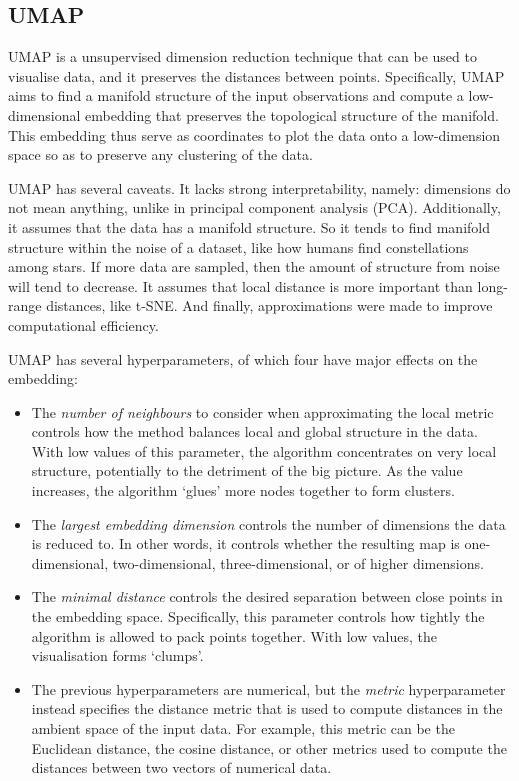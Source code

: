 \subsection{UMAP}
\label{subsec:analysis-clustering-umap}

UMAP \parencite{mcinnesUMAPUniformManifold2020} is a unsupervised dimension reduction technique that can be used to visualise data, and it preserves the distances between points.
Specifically, UMAP aims to find a manifold structure of the input observations and compute a low-dimensional embedding that preserves the topological structure of the manifold.
This embedding thus serve as coordinates to plot the data onto a low-dimension space so as to preserve any clustering of the data.

UMAP has several caveats.
It lacks strong interpretability, namely: dimensions do not mean anything, unlike in principal component analysis (PCA).
Additionally, it assumes that the data has a manifold structure.
So it tends to find manifold structure within the noise of a dataset, like how humans find constellations among stars.
If more data are sampled, then the amount of structure from noise will tend to decrease.
It assumes that local distance is more important than long-range distances, like t-SNE.
And finally, approximations were made to improve computational efficiency.

UMAP has several hyperparameters, of which four have major effects on the embedding:
\begin{itemize}
  \item The \emph{number of neighbours} to consider when approximating the local metric controls how the method balances local and global structure in the data.
        With low values of this parameter, the algorithm concentrates on very local structure, potentially to the detriment of the big picture.
        As the value increases, the algorithm `glues' more nodes together to form clusters.
  \item The \emph{largest embedding dimension} controls the number of dimensions the data is reduced to.
        In other words, it controls whether the resulting map is one-dimensional, two-dimensional, three-dimensional, or of higher dimensions.
  \item The \emph{minimal distance} controls the desired separation between close points in the embedding space.
        Specifically, this parameter controls how tightly the algorithm is allowed to pack points together.
        With low values, the visualisation forms `clumps'.
  \item The previous hyperparameters are numerical, but the \emph{metric} hyperparameter instead specifies the distance metric that is used to compute distances in the ambient space of the input data.
        For example, this metric can be the Euclidean distance, the cosine distance, or other metrics used to compute the distances between two vectors of numerical data.
\end{itemize}

